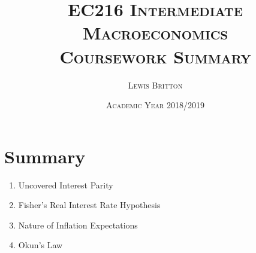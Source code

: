 \documentclass[11pt, english]{article}
\begin{document}

        \title{\textsc{EC216 Intermediate Macroeconomics\\ Coursework Summary}}
        \author{\textsc{Lewis Britton}}
        \date{\textsc{Academic Year 2018/2019}}
        \maketitle

\newpage


        \renewcommand{\contentsname}{Table of Contents}

        \tableofcontents

\newpage


\section{Summary}

	\begin{enumerate}
	\setlength\itemsep{0cm}
		\item Uncovered Interest Parity
		\item Fisher's Real Interest Rate Hypothesis
		\item Nature of Inflation Expectations
		\item Okun's Law
	\end{enumerate}
\end{document}
